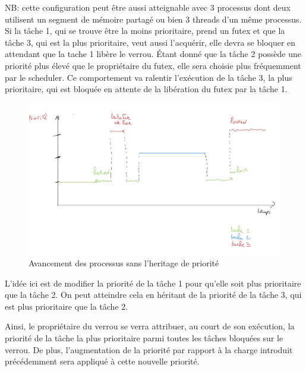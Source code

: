 NB: cette configuration peut être aussi atteignable avec 3 processus dont deux 
utilisent un segment de mémoire partagé ou bien 3 threads d'un même processus.
\\

Si la tâche 1, qui se trouve être la moins prioritaire, prend un futex et que 
la tâche 3, qui est la plus prioritaire, veut aussi l'acquérir, elle
devra se bloquer en attendant que la tache 1 libère le verrou. Étant donné que la tâche 2 possède une priorité plus élevé que le propriétaire du futex, elle sera choisie plus fréquemment par le scheduler. Ce comportement va ralentir l'exécution de la tâche 3, la plus prioritaire, qui est bloquée en attente de la libération du futex par la tâche 1.

\begin{figure}[h!]
	\centering
	\includegraphics[scale=0.21]{include/without_inherit.jpg}
	\caption{Avancement des processus sans l'heritage de priorité}
	\label{fig:without_inherit}
\end{figure}

\newpage


L'idée ici est de modifier la priorité de la tâche 1 pour qu'elle soit plus 
prioritaire que la tâche 2. On peut atteindre cela en héritant de la 
priorité de la tâche 3, qui est plus prioritaire que la tâche 2. 

Ainsi, le propriétaire du verrou se verra attribuer, au court de son exécution, la priorité de la tâche la plus prioritaire parmi toutes les tâches bloquées sur le verrou. De plus, l'augmentation de la priorité par rapport à la charge introduit précédemment sera appliqué à cette nouvelle priorité.

